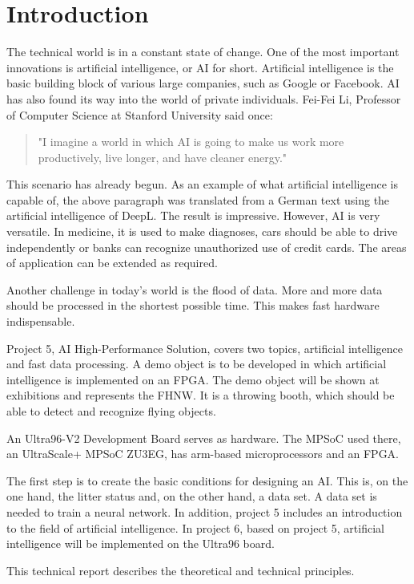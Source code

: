 \section{Introduction}
\label{sec:introduction}
The technical world is in a constant state of change. One of the most important innovations is artificial intelligence, or AI for short.
Artificial intelligence is the basic building block of various large companies, such as Google or Facebook.
AI has also found its way into the world of private individuals.
Fei-Fei Li, Professor of Computer Science at Stanford University said once:
\begin{quote}
	"I imagine a world in which AI is going to make us work more productively, live longer, and have cleaner energy."\cite{QuotesFuture}
\end{quote}
This scenario has already begun. As an example of what artificial intelligence is capable of, the above paragraph was translated from a German text using the artificial intelligence of DeepL. The result is impressive.
However, AI is very versatile. In medicine, it is used to make diagnoses, cars should be able to drive independently or banks can recognize unauthorized use of credit cards\cite{AIwiki}.
The areas of application can be extended as required.

Another challenge in today's world is the flood of data. More and more data should be processed in the shortest possible time. This makes fast hardware indispensable.

Project 5, AI High-Performance Solution, covers two topics, artificial intelligence and fast data processing.
A demo object is to be developed in which artificial intelligence is implemented on an FPGA.
The demo object will be shown at exhibitions and represents the FHNW.
It is a throwing booth, which should be able to detect and recognize flying objects.

An Ultra96-V2 Development Board serves as hardware.
The MPSoC used there, an UltraScale+ MPSoC ZU3EG, has arm-based microprocessors and an FPGA.

The first step is to create the basic conditions for designing an AI.
This is, on the one hand, the litter status and, on the other hand, a data set. A data set is needed to train a neural network.
In addition, project 5 includes an introduction to the field of artificial intelligence.
In project 6, based on project 5, artificial intelligence will be implemented on the Ultra96 board.

This technical report describes the theoretical and technical principles.